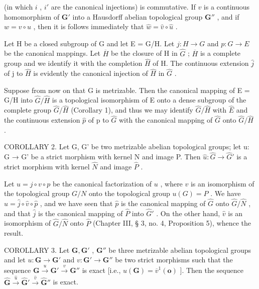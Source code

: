 (in which \(i\) , \(i'\) are the canonical injections) is commutative. If \(v\) is a continuous homomorphism of \(\mathbf{G}'\) into a Hausdorff abelian topological group \(\mathbf{G}''\) , and if \(w = v \circ u\) , then it is follows immediately that \(\hat{w} = \hat{v} \circ \hat{u}\) .

Let H be a closed subgroup of G and let E = G/H. Let \(j: H \to G\) and \(p: G \to E\) be the canonical mappings. Let \(\overline{H}\) be the closure of H in \(\hat{G}\) ; \(\overline{H}\) is a complete group and we identify it with the completion \(\hat{H}\) of H. The continuous extension \(\hat{j}\) of j to \(\hat{H}\) is evidently the canonical injection of \(\hat{H}\) in \(\hat{G}\) .

Suppose from now on that G is metrizable. Then the canonical mapping of E = G/H into \(\hat{G}/\hat{H}\) is a topological isomorphism of E onto a dense subgroup of the complete group \(\hat{G}/\hat{H}\) (Corollary 1), and thus we may identify \(\hat{G}/\hat{H}\) with \(\hat{E}\) and the continuous extension \(\hat{p}\) of p to \(\hat{G}\) with the canonical mapping of \(\hat{G}\) onto \(\hat{G}/\hat{H}\) .

COROLLARY 2. Let G, G' be two metrizable abelian topological groups; let u: G → G' be a strict morphism with kernel N and image P. Then \(\hat{u} : \hat{G} \rightarrow \hat{G}'\) is a strict morphism with kernel \(\hat{N}\) and image \(\hat{P}\) .

Let \(u = j \circ v \circ p\) be the canonical factorization of \(u\) , where \(v\) is an isomorphism of the topological group \(G/N\) onto the topological group \(u(G) = P\) . We have \(\hat{u} = \hat{j} \circ \hat{v} \circ \hat{p}\) , and we have seen that \(\hat{p}\) is the canonical mapping of \(\hat{G}\) onto \(\hat{G}/\hat{N}\) , and that \(\hat{j}\) is the canonical mapping of \(\hat{P}\) into \(\hat{G}'\) . On the other hand, \(\hat{v}\) is an isomorphism of \(\hat{G}/\hat{N}\) onto \(\hat{P}\) (Chapter III, § 3, no. 4, Proposition 5), whence the result.

COROLLARY 3. Let \(\mathbf{G}, \mathbf{G}'\) , \(\mathbf{G}''\) be three metrizable abelian topological groups and let \(u: \mathbf{G} \to \mathbf{G}'\) and \(v: \mathbf{G}' \to \mathbf{G}''\) be two strict morphisms such that the sequence \(\mathbf{G} \xrightarrow{u} \mathbf{G}' \xrightarrow{v} \mathbf{G}''\) is exact {[}i.e., \(u(\mathbf{G}) = \overline{v}^{1}(\mathbf{o})\) {]}. Then the sequence \(\hat{\mathbf{G}} \xrightarrow{\hat{u}} \hat{\mathbf{G}}' \xrightarrow{\hat{v}} \hat{\mathbf{G}}''\) is exact.

